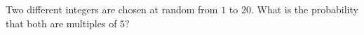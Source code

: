 Two different integers are chosen at random from $1$ to $20$. What is the probability that both are multiples of $5$?
